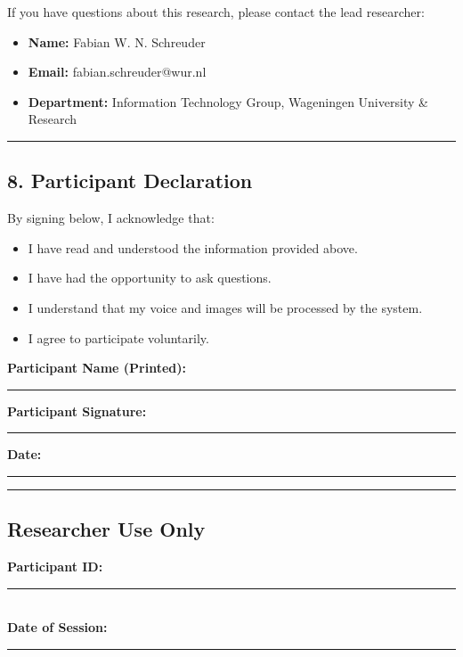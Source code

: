 If you have questions about this research, please contact the lead researcher:

\begin{itemize}
    \item \textbf{Name:} Fabian W. N. Schreuder
    \item \textbf{Email:} fabian.schreuder@wur.nl
    \item \textbf{Department:} Information Technology Group, Wageningen University \& Research
\end{itemize}

\vspace{1em}
\hrule
\vspace{1em}

\subsection*{8. Participant Declaration}

By signing below, I acknowledge that:

\begin{itemize}
    \item I have read and understood the information provided above.
    \item I have had the opportunity to ask questions.
    \item I understand that my voice and images will be processed by the system.
    \item I agree to participate voluntarily.
\end{itemize}

\vspace{2em}

\textbf{Participant Name (Printed):} \rule{8cm}{0.4pt}

\vspace{1em}

\textbf{Participant Signature:} \rule{8cm}{0.4pt}

\vspace{1em}

\textbf{Date:} \rule{4cm}{0.4pt}

\vspace{1em}
\hrule
\vspace{1em}

\subsection*{Researcher Use Only}

\textbf{Participant ID:} \rule{6cm}{0.4pt} \\
\textbf{Date of Session:} \rule{6cm}{0.4pt}

